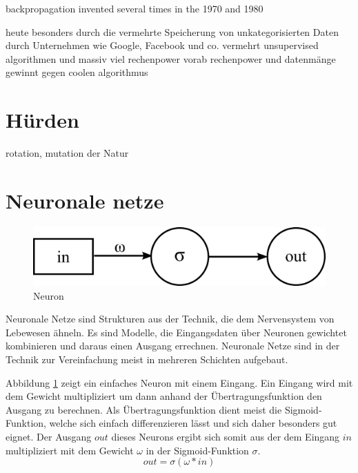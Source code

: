 backpropagation invented several times in the 1970 and 1980

heute besonders durch die vermehrte Speicherung von unkategorisierten Daten durch Unternehmen wie Google, Facebook und co. vermehrt unsupervised algorithmen und massiv viel rechenpower
vorab rechenpower und datenmänge gewinnt gegen coolen algorithmus

\section{Hürden}

rotation, mutation der Natur

\section{Neuronale netze}

\begin{figure}
	\centering
	\includegraphics[scale=1]{images/neuron.png}
	\caption{Neuron}
	\label{fig:neuron}
\end{figure}

Neuronale Netze sind Strukturen aus der Technik, die dem Nervensystem von Lebewesen ähneln. Es sind Modelle, die Eingangsdaten über Neuronen gewichtet kombinieren und daraus einen Ausgang errechnen. Neuronale Netze sind in der Technik zur Vereinfachung meist in mehreren Schichten aufgebaut.

Abbildung \ref{fig:neuron} zeigt ein einfaches Neuron mit einem Eingang. Ein Eingang wird mit dem Gewicht multipliziert um dann anhand der Übertragungsfunktion den Ausgang zu berechnen. Als Übertragungsfunktion dient meist die Sigmoid-Funktion, welche sich einfach differenzieren lässt und sich daher besonders gut eignet. Der Ausgang $out$ dieses Neurons ergibt sich somit aus der dem Eingang $in$ multipliziert mit dem Gewicht $\omega$ in der Sigmoid-Funktion $\sigma$.
$$out = \sigma(\omega * in)$$

